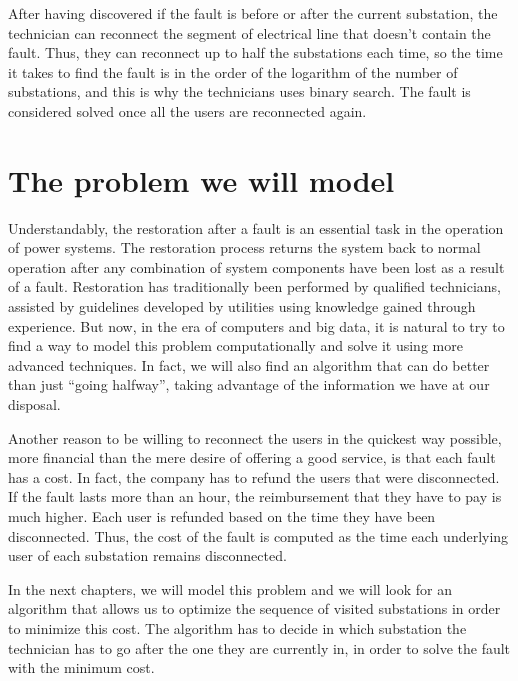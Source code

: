 After having discovered if the fault is before or after the current substation, the technician can reconnect the segment of electrical line that doesn't contain the fault. Thus, they can reconnect up to half the substations each time, so the time it takes to find the fault is in the order of the logarithm of the number of substations, and this is why the technicians uses binary search. The fault is considered solved once all the users are reconnected again.


\section{The problem we will model} %

Understandably, the restoration after a fault is an essential task in the operation of power systems. The restoration process returns the system back to normal operation after any combination of system components have been lost as a result of a fault. Restoration has traditionally been performed by qualified technicians, assisted by guidelines developed by utilities using knowledge gained through experience. But now, in the era of computers and big data, it is natural to try to find a way to model this problem computationally and solve it using more advanced techniques. In fact, we will also find an algorithm that can do better than just ``going halfway'', taking advantage of the information we have at our disposal.

Another reason to be willing to reconnect the users in the quickest way possible, more financial than the mere desire of offering a good service, is that each fault has a cost. In fact, the company has to refund the users that were disconnected. If the fault lasts more than an hour, the reimbursement that they have to pay is much higher. Each user is refunded based on the time they have been disconnected. Thus, the cost of the fault is computed as the time each underlying user of each substation remains disconnected.

In the next chapters, we will model this problem and we will look for an algorithm that allows us to optimize the sequence of visited substations in order to minimize this cost. The algorithm has to decide in which substation the technician has to go after the one they are currently in, in order to solve the fault with the minimum cost.